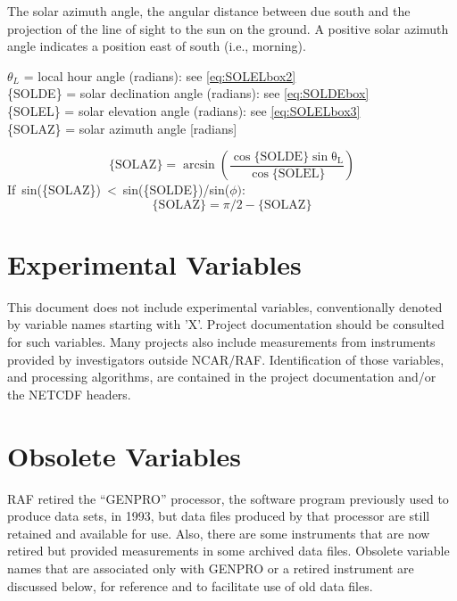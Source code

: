\documentclass[
  english,
]{book}
\begin{document}
The solar azimuth angle, the angular distance between due south and the projection of the line of sight to the sun on the ground. A positive solar azimuth angle indicates a position east of south (i.e., morning).

\(\theta_{L}\) = local hour angle (radians): see \eqref{eq:SOLELbox2}\\
\{SOLDE\} = solar declination angle (radians): see \eqref{eq:SOLDEbox}\\
\{SOLEL\} = solar elevation angle (radians): see \eqref{eq:SOLELbox3}\\
\{SOLAZ\} = solar azimuth angle {[}radians{]}

\begin{equation}
\mathrm{\{SOLAZ\}=\arcsin\left(\frac{\cos\mathrm{\{SOLDE\}\sin\theta_{L}}}{\cos\mathrm{\{SOLEL\}}}\right)}
\label{eq:SOLAZbox1}
\end{equation}
If~sin(\{SOLAZ\})~\textless~sin(\{SOLDE\})/sin(\(\phi):\)\\
\begin{equation}
\mathrm{\{SOLAZ\}} = \pi/2-\mathrm{\{SOLAZ\}}
\label{eq:SOLAZbox2}
\end{equation}

\hypertarget{experimental-variables}{%
\chapter{Experimental Variables}\label{experimental-variables}}

This document does not include experimental variables, conventionally denoted by variable names starting with 'X'. Project documentation should be consulted for such variables. Many projects also include measurements from instruments provided by investigators outside NCAR/RAF. Identification of those variables, and processing algorithms, are contained in the project documentation and/or the NETCDF headers.

\hypertarget{obsolete-variables}{%
\chapter{Obsolete Variables}\label{obsolete-variables}}

RAF retired the ``GENPRO'' processor, the software program previously used to produce data sets, in 1993, but data files produced by that processor are still retained and available for use. Also, there are some instruments that are now retired but provided measurements in some archived data files. Obsolete variable names that are associated only with GENPRO or a retired instrument are discussed below, for reference and to facilitate use of old data files.
\end{document}
